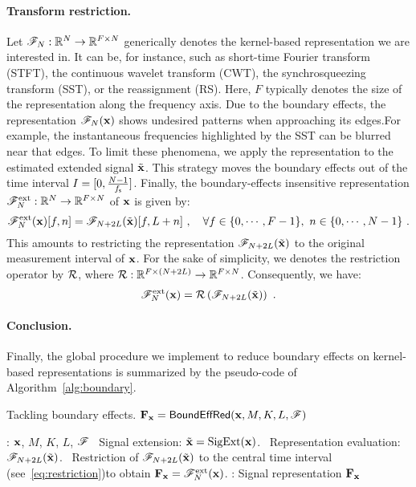 \paragraph{Transform restriction.} 
Let ${\mathscr F}_{N}:{\mathbb R}^{N}\to{\mathbb R}^{F\times N}$ generically denotes the kernel-based representation we are interested in. It can be, for instance, such as short-time Fourier transform (STFT), the continuous wavelet transform (CWT), the synchrosqueezing transform (SST), or the reassignment (RS). Here, $F$ typically denotes the size of the representation along the frequency axis. Due to the boundary effects, the representation ${\mathscr F}_{N}({\mathbf x})$ shows undesired patterns when approaching its edges.For example, the instantaneous frequencies highlighted by the SST can be blurred near that edges. To limit these phenomena, we apply the representation to the estimated extended signal $\tilde{{\mathbf x}}$. This strategy moves the boundary effects out of the time interval $I=[0, \frac{N-1}{f_{\mathsf s}}]$. Finally, the boundary-effects insensitive representation ${\mathscr F}_N^{\mathrm{ext}}:{\mathbb R}^{N}\to{\mathbb R}^{F\times N}$ of ${\mathbf x}$ is given by:
\begin{equation}
\ccF_N^{\mathrm{ext}}(\bx)[f,n] = \ccF_{N+2L}(\tilde \bx)[f,L+n]\ ,\quad\forall f\in\{0,\cdots,F-1\},\ n\in\{0,\cdots,N-1\}\ .
\label{eq:restriction}
\end{equation}
This amounts to restricting the representation ${\mathscr F}_{N+2L}(\tilde {{\mathbf x}})$ to the original measurement interval of ${\mathbf x}$. For the sake of simplicity, we denotes the restriction operator by ${\mathcal R}$, where ${\mathcal R}:{\mathbb R}^{F\times (N+2L)}\to{\mathbb R}^{F\times N}$. Consequently, we have:
\begin{equation*}
{\mathscr F}_N^{\mathrm{ext}}({\mathbf x}) = {\mathcal R}\left( {\mathscr F}_{N+2L}(\tilde {{\mathbf x}}) \right) \ .
\end{equation*}

\paragraph{Conclusion.}
Finally, the global procedure we implement to reduce boundary effects on kernel-based representations is summarized by the pseudo-code of Algorithm~\ref{alg:boundary}.

\begin{algorithm}
\caption{Tackling boundary effects. ${\mathbf F}_{\mathbf x} = \mathsf{BoundEffRed(}{\mathbf x},M,K,L,{\mathscr F})$}
\label{alg:boundary}
\begin{algorithmic}
: ${\mathbf x}$, $M$, $K$, $L$, ${\mathscr F}$
\STATE 
{}
\STATE \quad\textbullet\ Signal extension: $\tilde{{\mathbf x}} = \mathrm{SigExt}({\mathbf x})$.
\STATE 
{}
\STATE \quad\textbullet\ Representation evaluation: ${\mathscr F}_{N+2L}(\tilde{{\mathbf x}})$.
\STATE \quad\textbullet\ Restriction of ${\mathscr F}_{N+2L}(\tilde{{\mathbf x}})$ to the central time interval (see~\eqref{eq:restriction})to obtain ${\mathbf F}_{\mathbf x}={\mathscr F}_N^{\mathrm{ext}}({\mathbf x})$.
\STATE 
{}: Signal representation ${\mathbf F}_{\mathbf x}$
\end{algorithmic}
\end{algorithm}
